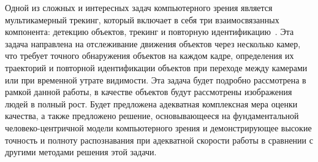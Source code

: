 Одной из сложных и интересных задач компьютерного зрения является мультикамерный трекинг, который включает в себя три взаимосвязанных компонента: детекцию объектов, трекинг и повторную идентификацию~\cite{zulfiqar, hu, hou, xu, ristani, narayan, wangxi, huangt, zajdel, gheissari, yi, liw, xuy, zheng, zhengl, sun, wangg, zhengm, wei, karanam, xiaot, zhenglia, mal, zhengs, kawanishi, figueira, layne, wangt, das, liwei2, liwei1, bialkowski, martinel, wangs, hirzer, baltieri, cheng, loy, zhengw, schwartz, gray, hermans, almazan, matsukawa, ristanie, zhengli}. Эта задача направлена на отслеживание движения объектов через несколько камер, что требует точного обнаружения объектов на каждом кадре, определения их траекторий и повторной идентификации объектов при переходе между камерами или при временной утрате видимости. Эта задача будет подробно рассмотрена в рамкой данной работы, в качестве объектов будут рассмотрены изображения людей в полный рост. Будет предложена адекватная комплексная мера оценки качества, а также предложено решение, основывающееся на фундаментальной человеко-центричной модели компьютерного зрения и демонстрирующее высокие точность и полноту распознавания при адекватной скорости работы в сравнении с другими методами решения этой задачи.





